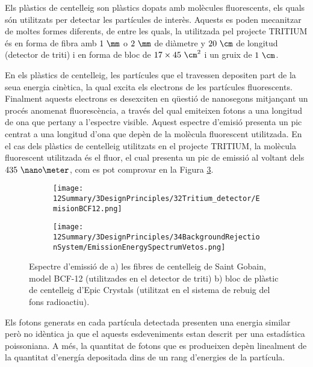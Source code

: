Els plàstics de centelleig son plàstics dopats amb molècules fluorescents, els quals són utilitzats per detectar les partícules de interès. Aquests es poden mecanitzar de moltes formes diferents, de entre les quals, la utilitzada pel projecte TRITIUM és en forma de fibra amb $1~\mm$ o $2~\mm$ de diàmetre y $20~\cm$ de longitud (detector de triti) i en forma de bloc de $17\times 45~\cm^2$ i un gruix de $1~\cm$. 

En els plàstics de centelleig, les partícules que el travessen depositen part de la seua energia cinètica, la qual excita els electrons de les partícules fluorescents. Finalment aquests electrons es desexciten en qüestió de nanosegons mitjançant un procés anomenat fluorescència, a través del qual emiteixen fotons a una longitud de ona que pertany a l'espectre visible. Aquest espectre d'emisió presenta un pic centrat a una longitud d'ona que depèn de la molècula fluorescent utilitzada. En el cas dels plàstics de centelleig utilitzats en el projecte TRITIUM, la molècula fluorescent utilitzada és el fluor, el cual presenta un pic de emissió al voltant dels $435~\nano\meter$, com es pot comprovar en la Figura \ref{fig:EspectreEmisioPlasticsTRITIUM}.

\begin{figure}
\centering
    \begin{subfigure}[b]{0.7\textwidth}
    \centering
    \texttt{[image: 12Summary/3DesignPrinciples/32Tritium\_detector/EmisionBCF12.png]}  
        \caption{}\label{subfig:EspectreEmisioFibres}
    \end{subfigure}
    \hfill
    \begin{subfigure}[b]{0.7\textwidth}
    \centering
    \texttt{[image: 12Summary/3DesignPrinciples/34BackgroundRejectionSystem/EmissionEnergySpectrumVetos.png]}  
    \caption{\label{subfig:EspectreEmisioVeto}}
    \end{subfigure}
\caption{Espectre d'emissió de a) les fibres de centelleig de Saint Gobain, model BCF-12 (utilitzades en el detector de triti) \cite{DataSheetBCF12Fiber} b) bloc de plàstic de centelleig d'Epic Crystals (utilitzat en el sistema de rebuig del fons radioactiu)\cite{ScintillatorVeto}\label{fig:EspectreEmisioPlasticsTRITIUM}.}
\end{figure}

Els fotons generats en cada partícula detectada presenten una energia similar però no idèntica ja que el aquests esdeveniments estan descrit per una estadística poissoniana. A més, la quantitat de fotons que es produeixen depèn linealment de la quantitat d'energía depositada dins de un rang d'energies de la partícula.

